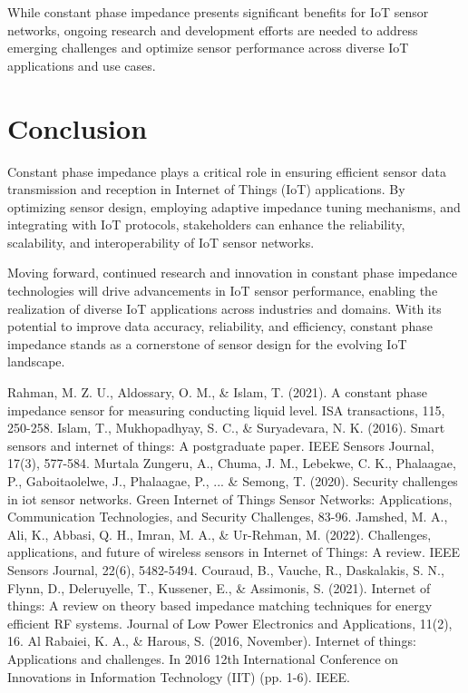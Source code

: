 \documentclass[12pt]{report}
\begin{document}
While constant phase impedance presents significant benefits for IoT sensor networks, ongoing research and development efforts are needed to address emerging challenges\cite{internet} and optimize sensor performance across diverse IoT applications and use cases.


\newpage
\section*{Conclusion}
Constant phase impedance plays a critical role in ensuring efficient sensor data transmission and reception in Internet of Things (IoT) applications. By optimizing sensor design, employing adaptive impedance tuning mechanisms, and integrating with IoT protocols, stakeholders can enhance the reliability, scalability, and interoperability of IoT sensor networks.

Moving forward, continued research and innovation in constant phase impedance technologies will drive advancements in IoT sensor performance, enabling the realization of diverse IoT applications across industries and domains. With its potential to improve data accuracy, reliability, and efficiency, constant phase impedance stands as a cornerstone of sensor design for the evolving IoT landscape.


\newpage
\renewcommand{\bibname}{References}
\begin{thebibliography}{}
    Rahman, M. Z. U., Aldossary, O. M., \& Islam, T. (2021). A constant phase impedance sensor for measuring conducting liquid level. ISA transactions, 115, 250-258.
    Islam, T., Mukhopadhyay, S. C., \& Suryadevara, N. K. (2016). Smart sensors and internet of things: A postgraduate paper. IEEE Sensors Journal, 17(3), 577-584.
    Murtala Zungeru, A., Chuma, J. M., Lebekwe, C. K., Phalaagae, P., Gaboitaolelwe, J., Phalaagae, P., ... \& Semong, T. (2020). Security challenges in iot sensor networks. Green Internet of Things Sensor Networks: Applications, Communication Technologies, and Security Challenges, 83-96.
    Jamshed, M. A., Ali, K., Abbasi, Q. H., Imran, M. A., \& Ur-Rehman, M. (2022). Challenges, applications, and future of wireless sensors in Internet of Things: A review. IEEE Sensors Journal, 22(6), 5482-5494.
    Couraud, B., Vauche, R., Daskalakis, S. N., Flynn, D., Deleruyelle, T., Kussener, E., \& Assimonis, S. (2021). Internet of things: A review on theory based impedance matching techniques for energy efficient RF systems. Journal of Low Power Electronics and Applications, 11(2), 16.
    Al Rabaiei, K. A., \& Harous, S. (2016, November). Internet of things: Applications and challenges. In 2016 12th International Conference on Innovations in Information Technology (IIT) (pp. 1-6). IEEE.
\end{thebibliography}
\end{document}
